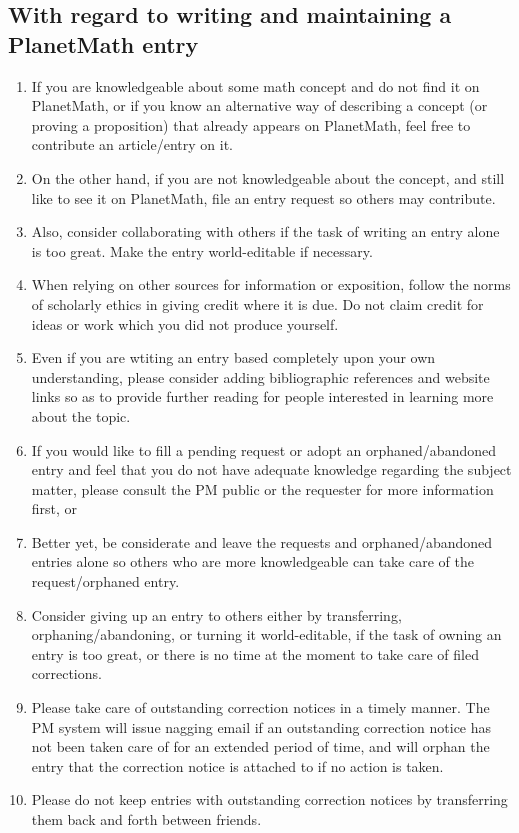 \subsection{With regard to writing and maintaining a PlanetMath entry}
\begin{enumerate}
\item If you are knowledgeable about some math concept and do not find it on PlanetMath, or if you know an alternative way of describing a concept (or proving a proposition) that already appears on PlanetMath, feel free to contribute an article/entry on it.
\item On the other hand, if you are not knowledgeable about the concept, and still like to see it on PlanetMath, file an entry request so others may contribute.
\item Also, consider collaborating with others if the task of writing an entry alone is too great. Make the entry world-editable if necessary.
\item  When relying on other sources for information or exposition, follow the norms of scholarly ethics in giving credit where it is due.  Do not claim credit for ideas or work which you did not produce yourself.
\item Even if you are wtiting an entry based completely upon your own understanding, please consider adding bibliographic references and website links so as to provide further reading for people interested in learning more about the topic.
\item If you would like to fill a pending request or adopt an orphaned/abandoned entry and feel that you do not have adequate knowledge regarding the subject matter, please consult the PM public or the requester for more information first, or
\item Better yet, be considerate and leave the requests and orphaned/abandoned entries alone so others who are more knowledgeable can take care of the request/orphaned entry.
\item Consider giving up an entry to others either by transferring, orphaning/abandoning, or turning it world-editable, if the task of owning an entry is too great, or there is no time at the moment to take care of filed corrections.
\item Please take care of outstanding correction notices in a timely manner. The PM system will issue nagging email if an outstanding correction notice has not been taken care of for an extended period of time, and will orphan the entry that the correction notice is attached to if no action is taken.
\item Please do not keep entries with outstanding correction notices by transferring them back and forth between friends. 
\end{enumerate}

